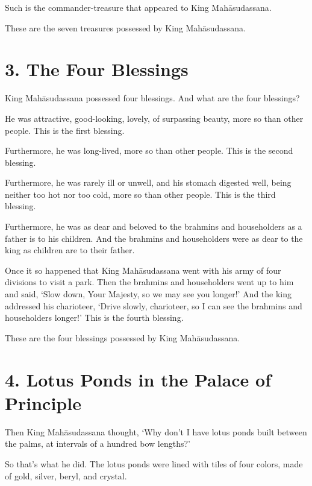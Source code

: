 \documentclass[12pt,openany]{book}%
\begin{document}
Such is the commander-treasure that appeared to King \textsanskrit{Mahāsudassana}. 

These are the seven treasures possessed by King \textsanskrit{Mahāsudassana}. 

\section*{3. The Four Blessings }

King \textsanskrit{Mahāsudassana} possessed four blessings. And what are the four blessings? 

He was attractive, good-looking, lovely, of surpassing beauty, more so than other people. This is the first blessing. 

Furthermore, he was long-lived, more so than other people. This is the second blessing. 

Furthermore, he was rarely ill or unwell, and his stomach digested well, being neither too hot nor too cold, more so than other people. This is the third blessing. 

Furthermore, he was as dear and beloved to the brahmins and householders as a father is to his children. And the brahmins and householders were as dear to the king as children are to their father. 

Once it so happened that King \textsanskrit{Mahāsudassana} went with his army of four divisions to visit a park. Then the brahmins and householders went up to him and said, ‘Slow down, Your Majesty, so we may see you longer!’ And the king addressed his charioteer, ‘Drive slowly, charioteer, so I can see the brahmins and householders longer!’ This is the fourth blessing. 

These are the four blessings possessed by King \textsanskrit{Mahāsudassana}. 

\section*{4. Lotus Ponds in the Palace of Principle }

Then King \textsanskrit{Mahāsudassana} thought, ‘Why don’t I have lotus ponds built between the palms, at intervals of a hundred bow lengths?’ 

So that’s what he did. The lotus ponds were lined with tiles of four colors, made of gold, silver, beryl, and crystal. 
\end{document}
